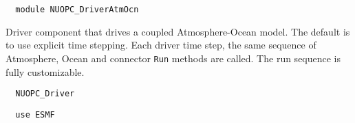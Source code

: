  
\setlength{\parskip}{0pt}
\setlength{\parindent}{0pt}
\setlength{\baselineskip}{11pt}
 
\def\bv{\begin{verbatim}}
\def\ev{\end{verbatim}}
\def\be{\begin{equation}}
\def\ee{\end{equation}}
\def\bea{\begin{eqnarray}}
\def\eea{\end{eqnarray}}
\def\bi{\begin{itemize}}
\def\ei{\end{itemize}}
\def\bn{\begin{enumerate}}
\def\en{\end{enumerate}}
\def\bd{\begin{description}}
\def\ed{\end{description}}
\def\({\left (}
\def\){\right )}
\def\[{\left [}
\def\]{\right ]}
\def\<{\left  \langle}
\def\>{\right \rangle}
\def\cI{{\cal I}}
\def\diag{\mathop{\rm diag}}
\def\tr{\mathop{\rm tr}}


\begin{verbatim}  module NUOPC_DriverAtmOcn
\end{verbatim}

Driver component that drives a coupled Atmosphere-Ocean model. The default is to use explicit time stepping. Each driver time step, the same sequence of Atmosphere, Ocean and connector {\tt Run} methods are called. The run sequence is fully customizable.

\begin{verbatim}  NUOPC_Driver
\end{verbatim}

\begin{verbatim}  use ESMF
\end{verbatim}

